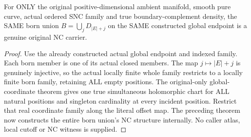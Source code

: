 \begin{theorem}
\label{hir:sharp-actual-original-born-union-nc}
\leanok
For ONLY the original positive-dimensional ambient manifold, smooth
pure curve, actual ordered SNC family and true boundary-complement
density, the SAME born union $B=\bigcup_j D_{|E|+j}$ on the SAME
constructed global endpoint is a genuine original NC carrier.
\end{theorem}
\begin{proof}
Use the already constructed actual global endpoint and indexed family.
Each born member is one of its actual closed members. The map
$j\mapsto |E|+j$ is genuinely injective, so the actual locally finite
whole family restricts to a locally finite born family, retaining ALL
empty positions. The original-only global-coordinate theorem gives
one true simultaneous holomorphic chart for ALL natural positions and
singleton cardinality at every incident position. Restrict that real
coordinate family along the literal offset map. The preceding theorem
now constructs the entire born union's NC structure internally. No
caller atlas, local cutoff or NC witness is supplied.
\end{proof}

